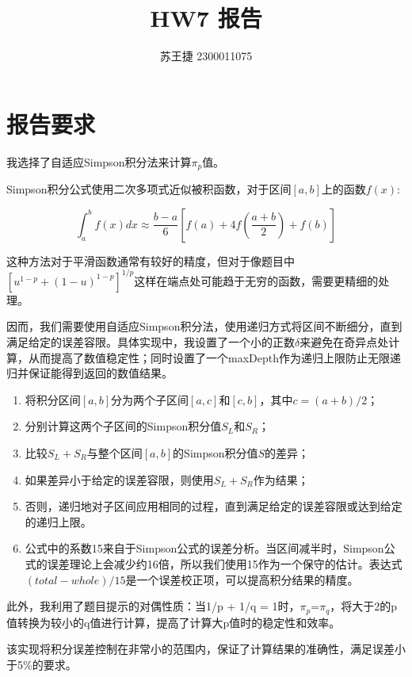 \documentclass{article}
\title{HW7 报告}
\author{苏王捷 2300011075}
\begin{document}
\maketitle

\section{报告要求}

我选择了自适应Simpson积分法来计算$\pi_p$值。

Simpson积分公式使用二次多项式近似被积函数，对于区间$[a,b]$上的函数$f(x)$:

$$\int_a^b f(x) dx \approx \frac{b-a}{6}\left[f(a) + 4f\left(\frac{a+b}{2}\right) + f(b)\right]$$

这种方法对于平滑函数通常有较好的精度，但对于像题目中$[u^{1-p}+(1-u)^{1-p}]^{1/p}$这样在端点处可能趋于无穷的函数，需要更精细的处理。

因而，我们需要使用自适应Simpson积分法，使用递归方式将区间不断细分，直到满足给定的误差容限。具体实现中，我设置了一个小的正数$\delta$来避免在奇异点处计算，从而提高了数值稳定性；同时设置了一个maxDepth作为递归上限防止无限递归并保证能得到返回的数值结果。

\begin{enumerate}
\item 将积分区间$[a,b]$分为两个子区间$[a,c]$和$[c,b]$，其中$c=(a+b)/2$；
\item 分别计算这两个子区间的Simpson积分值$S_L$和$S_R$；
\item 比较$S_L + S_R$与整个区间$[a,b]$的Simpson积分值$S$的差异；
\item 如果差异小于给定的误差容限，则使用$S_L + S_R$作为结果；
\item 否则，递归地对子区间应用相同的过程，直到满足给定的误差容限或达到给定的递归上限。
\item 公式中的系数15来自于Simpson公式的误差分析。当区间减半时，Simpson公式的误差理论上会减少约16倍，所以我们使用15作为一个保守的估计。表达式$(total - whole) / 15$是一个误差校正项，可以提高积分结果的精度。
\end{enumerate}

此外，我利用了题目提示的对偶性质：当1/p + 1/q = 1时，$\pi_p$=$\pi_q$，将大于2的p值转换为较小的q值进行计算，提高了计算大p值时的稳定性和效率。

该实现将积分误差控制在非常小的范围内，保证了计算结果的准确性，满足误差小于5\%的要求。
\end{document}
